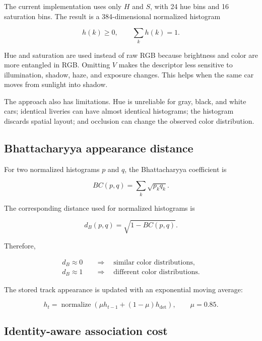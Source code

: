 \documentclass[11pt]{article}
\newcommand{\normalize}{\operatorname{normalize}}
\begin{document}
The current implementation uses only $H$ and $S$, with 24 hue bins and 16
saturation bins. The result is a 384-dimensional normalized histogram

\begin{equation}
h(k)\ge0,
\qquad
\sum_kh(k)=1.
\end{equation}

Hue and saturation are used instead of raw RGB because brightness and color
are more entangled in RGB. Omitting $V$ makes the descriptor less sensitive to
illumination, shadow, haze, and exposure changes. This helps when the same car
moves from sunlight into shadow.

The approach also has limitations. Hue is unreliable for gray, black, and
white cars; identical liveries can have almost identical histograms; the
histogram discards spatial layout; and occlusion can change the observed color
distribution.

\subsection{Bhattacharyya appearance distance}

For two normalized histograms $p$ and $q$, the Bhattacharyya coefficient is

\begin{equation}
BC(p,q)=\sum_k\sqrt{p_kq_k}.
\end{equation}

The corresponding distance used for normalized histograms is

\begin{equation}
d_B(p,q)=\sqrt{1-BC(p,q)}.
\end{equation}

Therefore,

\begin{align}
d_B\approx0 &\quad\Longrightarrow\quad
\text{similar color distributions},\\
d_B\approx1 &\quad\Longrightarrow\quad
\text{different color distributions}.
\end{align}

The stored track appearance is updated with an exponential moving average:

\begin{equation}
h_t=\normalize\left(\mu h_{t-1}+(1-\mu)h_{\mathrm{det}}\right),
\qquad \mu=0.85.
\end{equation}

\subsection{Identity-aware association cost}
\end{document}
